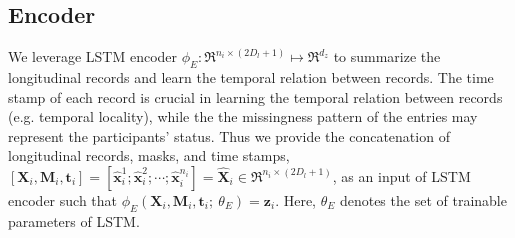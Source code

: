\subsection{Encoder}
We leverage LSTM encoder $\phi_{E}: \Re^{n_i \times (2 D_l + 1)} \mapsto \Re^{d_z}$ to summarize the longitudinal records and learn the temporal relation between records. The time stamp of each record is crucial in learning the temporal relation between records (e.g. temporal locality), while the the missingness pattern of the entries may represent the participants' status. Thus we provide the concatenation of longitudinal records, masks, and time stamps, $[\mathbf{X}_i, \mathbf{M}_i, \mathbf{t}_i] = [\hat{\mathbf{x}}_i^1; \hat{\mathbf{x}}_i^2; \cdots; \hat{\mathbf{x}}_i^{n_i}] = \hat{\mathbf{X}}_i \in \Re^{n_i \times (2 D_l + 1)}$, as an input of LSTM encoder such that $\phi_{E}(\mathbf{X}_i, \mathbf{M}_i, \mathbf{t}_i;\ \theta_E) = \mathbf{z}_i$. Here, $\theta_E$ denotes the set of trainable parameters of LSTM.

